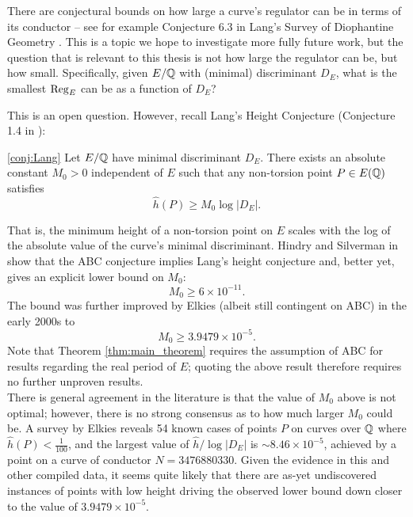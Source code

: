 There are conjectural bounds on how large a curve's regulator can be in terms of its conductor -- see for example Conjecture 6.3 in Lang's Survey of Diophantine Geometry \cite[p. 99]{Lang-1997}. This is a topic we hope to investigate more fully future work, but the question that is relevant to this thesis is not how large the regulator can be, but how small. Specifically, given $E/\mathbb{Q}$ with (minimal) discriminant $D_E$, what is the smallest $\operatorname{Reg}_E$ can be as a function of $D_E$?

This is an open question. However, recall Lang's Height Conjecture (Conjecture 1.4 in \cite[pp. 73-74]{Lang-1997}):
\begin{quotedconjecture}{\ref{conj:Lang}}
Let $E/\mathbb{Q}$ have minimal discriminant $D_E$. There exists an absolute constant $M_0 >0$ independent of $E$ such that any non-torsion point $P \in E(\mathbb{Q})$ satisfies
\begin{equation}
\hat{h}(P) \ge M_0 \log |D_E| .
\end{equation}
\end{quotedconjecture}
That is, the minimum height of a non-torsion point on $E$ scales with the log of the absolute value of the curve's minimal discriminant. Hindry and Silverman in \cite{HiS-1988} show that the ABC conjecture implies Lang's height conjecture and, better yet, gives an explicit lower bound on $M_0$:
\begin{equation}
M_0 \ge 6\times 10^{-11}.
\end{equation}
The bound was further improved  by Elkies (albeit still contingent on ABC) in the early 2000s \cite{Elk-2006} to
\begin{equation}
M_0 \ge 3.9479\times 10^{-5}.
\end{equation}
Note that Theorem \ref{thm:main_theorem} requires the assumption of ABC for results regarding the real period of $E$; quoting the above result therefore requires no further unproven results. \\

There is general agreement in the literature is that the value of $M_0$ above is not optimal; however, there is no strong consensus as to how much larger $M_0$ could be. A survey by Elkies \cite{ElSt-2002} reveals 54 known cases of points $P$ on curves over $\mathbb{Q}$ where $\hat{h}(P) < \frac{1}{100}$, and the largest value of $\hat{h}/\log|D_E|$ is $\sim 8.46 \times 10^{-5}$, achieved by a point on a curve of conductor $N=3476880330$. Given the evidence in this and other compiled data, it seems quite likely that there are as-yet undiscovered instances of points with low height driving the observed lower bound down closer to the value of $3.9479\times 10^{-5}$. \\

